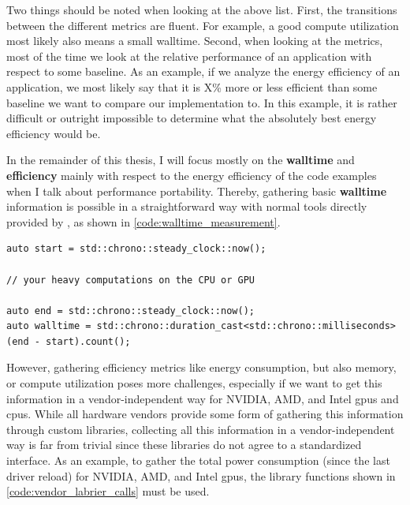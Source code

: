 Two things should be noted when looking at the above list. 
First, the transitions between the different metrics are fluent. 
For example, a good compute utilization most likely also means a small walltime. 
Second, when looking at the metrics, most of the time we look at the relative performance of an application with respect to some baseline. 
As an example, if we analyze the energy efficiency of an application, we most likely say that it is X\si{\percent} more or less efficient than some baseline we want to compare our implementation to. 
In this example, it is rather difficult or outright impossible to determine what the absolutely best energy efficiency would be. 

In the remainder of this thesis, I will focus mostly on the \textbf{walltime} and \textbf{efficiency} mainly with respect to the energy efficiency of the code examples when I talk about performance portability. 
Thereby, gathering basic \textbf{walltime} information is possible in a straightforward way with normal tools directly provided by \cpp, as shown in \autoref{code:walltime_measurement}.

\begin{listing}
    \begin{verbatim}
auto start = std::chrono::steady_clock::now();

// your heavy computations on the CPU or GPU

auto end = std::chrono::steady_clock::now();
auto walltime = std::chrono::duration_cast<std::chrono::milliseconds>(end - start).count();
    \end{verbatim}
    \caption{A small example on how to gather the \textbf{walltime} of a code using the   library.}
    \label{code:walltime_measurement}
\end{listing}

However, gathering efficiency metrics like energy consumption, but also memory, or compute utilization poses more challenges, especially if we want to get this information in a vendor-independent way for NVIDIA, AMD, and Intel \glspl{gpu} and \glspl{cpu}. 
While all hardware vendors provide some form of gathering this information through custom libraries, collecting all this information in a vendor-independent way is far from trivial since these libraries do not agree to a standardized interface. 
As an example, to gather the total power consumption (since the last driver reload) for NVIDIA, AMD, and Intel \glspl{gpu}, the library functions shown in \autoref{code:vendor_labrier_calls} must be used.

